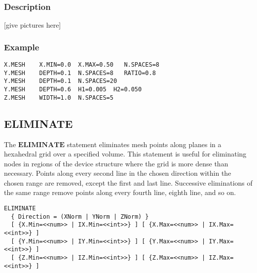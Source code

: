 \documentclass[oneside,12pt]{cgd_book}
\begin{document}
\par
\subsubsection{Description}
[give pictures here]
\par
\subsubsection{Example}
\begin{lstlisting}[style=GeniusCode]
X.MESH    X.MIN=0.0  X.MAX=0.50   N.SPACES=8
Y.MESH    DEPTH=0.1  N.SPACES=8   RATIO=0.8
Y.MESH    DEPTH=0.1  N.SPACES=20
Y.MESH    DEPTH=0.6  H1=0.005  H2=0.050
Z.MESH    WIDTH=1.0  N.SPACES=5
\end{lstlisting}
\subsection{ELIMINATE}
The
$\mathbf{ELIMINATE}$ statement eliminates mesh points along planes in a hexahedral
        grid over a specified volume. This statement is useful for eliminating nodes in regions of the device structure
        where the grid is more dense than necessary. Points along every second line in the chosen direction within the
        chosen range are removed, except the first and last line. Successive eliminations of the same range remove
        points along every fourth line, eighth line, and so on.
\par
\begin{lstlisting}[style=GeniusCmd]
ELIMINATE
  { Direction = (XNorm | YNorm | ZNorm) }
  [ {X.Min=<<num>> | IX.Min=<<int>>} ] [ {X.Max=<<num>> | IX.Max=<<int>>} ]
  [ {Y.Min=<<num>> | IY.Min=<<int>>} ] [ {Y.Max=<<num>> | IY.Max=<<int>>} ]
  [ {Z.Min=<<num>> | IZ.Min=<<int>>} ] [ {Z.Max=<<num>> | IZ.Max=<<int>>} ]
\end{lstlisting}
\end{document}
